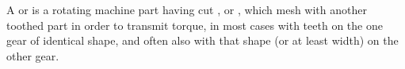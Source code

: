 \begin{module}[id=gear]
\begin{definition}
  A  or  is a rotating machine part having cut
  , or , which mesh with another toothed part in
  order to transmit torque, in most cases with teeth on the one gear of identical shape,
  and often also with that shape (or at least width) on the other gear.
\end{definition}
\end{module}
